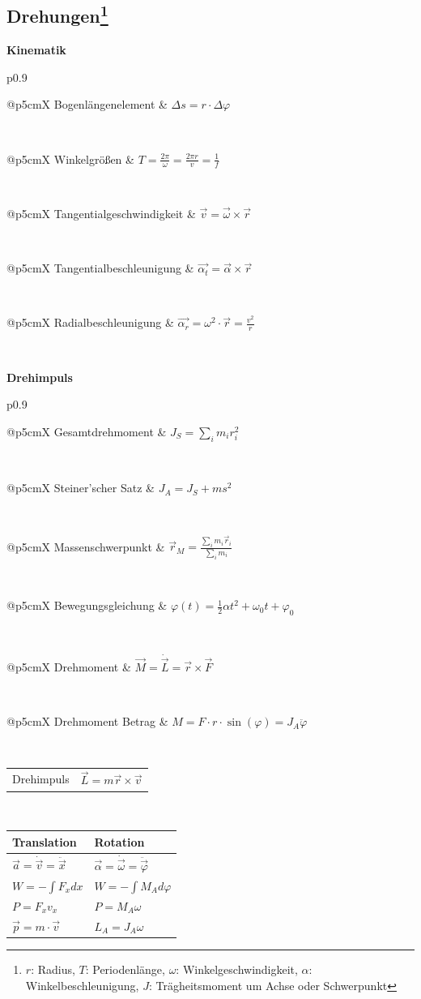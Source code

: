 \documentclass[12pt,a4paper, twoside]{article}
\makeatletter
\renewcommand{\=}[1]{\stackrel{#1}{=}}
\theoremstyle{definition}
\theoremstyle{remark}
\newcommand{\concept}[2]{%
\noindent
\begin{framed}
\noindent\textbf{#1}
\par\begin{tabular}{p{0.9\linewidth}}
#2
\end{tabular}
\end{framed}
}
\newcommand{\f}[2]{%
\noindent\begin{tabularx}{\linewidth}{@{}p{5cm}X}
#1 & $#2$
\end{tabularx}}
\makeatother
\begin{document}
\newpage
\subsection[Drehungen]{Drehungen\let\thefootnote\relax\footnote{$r$: Radius, $T$: Periodenlänge, $\omega$: Winkelgeschwindigkeit, $\alpha$: Winkelbeschleunigung, $J$: Trägheitsmoment um Achse oder Schwerpunkt}}


\concept{Kinematik}{

\f{Bogenlängenelement}{\Delta s = r \cdot \Delta \varphi}\\
\f{Winkelgrößen}{T = \frac{2 \pi}{\omega} = \frac{2 \pi r}{v} = \frac{1}{f}}\\
\f{Tangentialgeschwindigkeit}{\vec{v} = \vec{\omega} \times \vec{r}}\\
\f{Tangentialbeschleunigung}{\vec{\alpha_t} = \vec{\alpha} \times \vec{r}}\\
\f{Radialbeschleunigung}{\vec{\alpha_r} = \omega^2 \cdot \vec{r} = \frac{v^2}{r}}\\
}

\concept{Drehimpuls}{

\f{Gesamtdrehmoment}{J_S = \sum_i m_i r^2_i}\\
\f{Steiner'scher Satz}{J_A = J_S + m s^2}\\
\f{Massenschwerpunkt}{\vec{r}_M = \frac{\sum_i m_i \vec{r}_i}{\sum_i m_i}}\\
\f{Bewegungsgleichung}{\varphi(t) = \frac{1}{2} \alpha t^2 + \omega_0 t + \varphi_0}\\
\f{Drehmoment}{\vec{M} = \dot{\vec{L}} = \vec{r} \times \vec{F}}\\
\f{Drehmoment Betrag}{M = F \cdot r \cdot \sin(\varphi) = J_A \ddot{\varphi}}\\
\f{Drehimpuls}{\vec{L} = m \vec{r} \times \vec{v}}\\
}

\begin{center}
\begin{framed}
\begin{tabular}{ll}
Translation & Rotation\\
\midrule
$\vec{a} = \dot{\vec{v}} = \ddot{\vec{x}}$ & $\vec{\alpha} = \dot{\vec{\omega}} = \ddot{\vec{\varphi}}$\\
$W = -\int F_x dx$ & $W = -\int M_A d \varphi$ \\
$P = F_xv_x$ & $P = M_A \omega$ \\
$\vec{p} = m \cdot \vec{v}$ & $L_A = J_A \omega$ \\
\end{tabular}
\end{framed}
\end{center}
\end{document}
